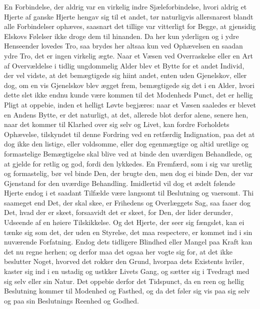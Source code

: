 \documentclass[12pt,a4paper]{book}
\newcommand{\apage}[1]{\marginnote{\footnotesize\textit{[#1]}}}
\begin{document}
En Forbindelse, der aldrig var en virkelig indre Sjæleforbindelse, hvori
aldrig et Hjerte af ganske Hjerte hengav sig til et andet, tør
naturligvis allersnarest blandt alle Forbindelser ophæves, saasnart det
tillige var vitterligt for Begge, at gjensidig Elskovs Følelser ikke
droge dem til hinanden. Da her kun yderligen og i ydre Henseender lovedes
Tro, saa brydes her altsaa kun ved Ophævelsen en saadan ydre Tro, det er
ingen virkelig ægte. Naar et Væsen ved Overraskelse eller en Art af
Overvældelse i tidlig ungdommelig Alder blev et Bytte for et andet
Individ, der vel vidste, at det bemægtigede sig hiint andet, enten uden
Gjenelskov, eller dog, om en vis Gjenelskov blev ægget frem, bemægtigede
sig det i en Alder, hvori dette slet ikke endnu kunde være kommen til det
Modenheds Punct, det er hellig Pligt at oppebie, inden et helligt Løvte
begjæres: naar et Væsen saaledes er blevet en Andens Bytte, er det
naturligt, at det, allerede blot derfor alene, senere hen, naar det
kommer til Klarhed over sig selv og Livet, kan fordre Forholdets
Ophævelse, tilskyndet til denne Fordring ved en retfærdig Indignation,
paa det at dog ikke den listige, eller voldsomme, eller dog egenmægtige
og altid uretlige og \apage{149} formastelige Bemægtigelse skal blive ved at binde
den uværdigen Behandlede, og at gjelde for retlig og god, fordi den
lykkedes. En Fremfærd, som i sig var uretlig og formastelig, bør vel
binde Den, der brugte den, men dog ei binde Den, der var Gjenstand for
den uværdige Behandling. Imidlertid vil dog et ædelt følende Hjerte endog
i et saadant Tilfælde være langsomt til Beslutning og vaersomt. Thi
saameget end Det, der skal skee, er Frihedens og Overlæggets Sag, saa
faaer dog Det, hvad der er skeet, forsaavidt det er skeet, for Den, der
lider derunder, Udseende af en høiere Tilskikkelse. Og det Hjerte, der
seer sig fængslet, kan ei tænke sig som det, der uden en Styrelse, det maa
respectere, er kommet ind i sin nuværende Forfatning. Endog dets tidligere
Blindhed eller Mangel paa Kraft kan det nu regne herhen; og derfor maa
det ogsaa her vogte sig for, at det ikke beslutter Noget, hvorved det
rokker den Grund, hvorpaa dets Existents hviler, kaster sig ind i en
ustadig og ustkker%
Livets Gang, og sætter sig i Tvedragt med sig selv eller sin Natur. Det
oppebie derfor det Tidspunct, da en reen og hellig Beslutning kommer til
Modenhed og Fasthed, og da det føler sig vis paa sig selv og paa sin
Beslutnings Reenhed og Godhed.
\end{document}
